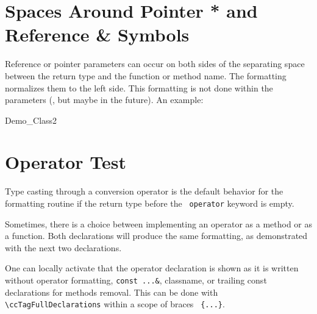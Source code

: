 \documentclass[12pt]{article}
\begin{document}
{%
\section{Spaces Around Pointer * and Reference \& Symbols}

Reference or pointer parameters can occur on both sides of the
separating space between the return type and the function or method
name. The formatting normalizes them to the left side. This
formatting is not done within the\footnotemark{} parameters (, but maybe in the
future). An example: 

%


    \ccGlue
    \ccGlue
    \ccGlue

\begin{ccClass}{Demo_Class2}
\section{Operator Test}

Type casting through a conversion operator is the default behavior 
for the formatting routine if the return type before the {\tt 
operator} keyword is empty.

    \ccGlue

Sometimes, there is a choice between
implementing an operator as a method or as a function. Both
declarations will produce the same formatting, as demonstrated
with the next two declarations.


    \ccGlue

One can locally activate that the operator declaration is shown as it
is written without operator formatting, {\tt const ...\&}, classname, or
trailing const declarations for methods removal. This can be done with
\verb+\+\verb+ccTagFullDeclarations+ within a scope of braces {\tt
  \{...\}}.


\end{ccClass}}
\end{document}
